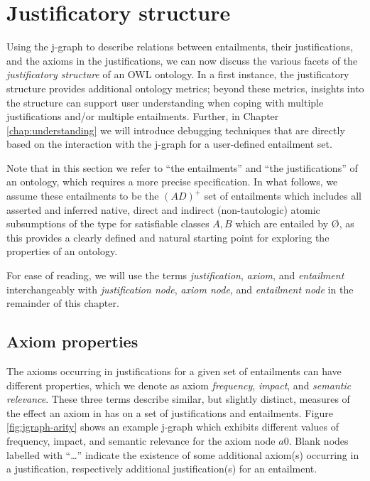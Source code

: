 \section{Justificatory structure}

Using the j-graph to describe relations between entailments, their justifications, and the axioms in the justifications, we can now discuss the various facets of the \emph{justificatory structure} of an OWL ontology. In a first instance, the justificatory structure provides additional ontology metrics; beyond these metrics, insights into the structure can support user understanding when coping with multiple justifications and/or multiple entailments. Further, in Chapter \ref{chap:understanding} we will introduce debugging techniques that are directly based on the interaction with the j-graph for a user-defined entailment set. 

Note that in this section we refer to \enquote{the entailments} and \enquote{the justifications} of an ontology, which requires a more precise specification. In what follows, we assume these entailments to be the $(AD)^{+}$ set of entailments which includes all asserted and inferred native, direct and indirect (non-tautologic) atomic subsumptions of the type  for satisfiable classes $A, B$ which are entailed by \O, as this provides a clearly defined and natural starting point for exploring the properties of an ontology.

For ease of reading, we will use the terms \emph{justification}, \emph{axiom}, and \emph{entailment} interchangeably with \emph{justification node}, \emph{axiom node}, and \emph{entailment node} in the remainder of this chapter.

\subsection{Axiom properties}
\label{sec:arity}
The axioms occurring in justifications for a given set of entailments can have different properties, which we denote as axiom \emph{frequency}, \emph{impact}, and \emph{semantic relevance}. These three terms describe similar, but slightly distinct, measures of the effect an axiom in \justax has on a set of justifications and entailments. Figure \ref{fig:jgraph-arity} shows an example j-graph which exhibits different values of frequency, impact, and semantic relevance for the axiom node $a0$. Blank nodes labelled with \enquote{\ldots} indicate the existence of some additional axiom(s) occurring in a justification, respectively additional justification(s) for an entailment.

